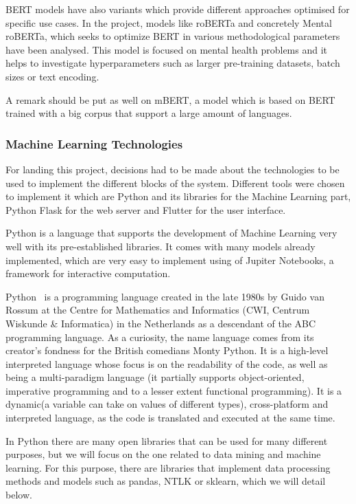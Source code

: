 BERT models have also variants which provide different approaches optimised for specific use cases. In the project, models like roBERTa and concretely Mental roBERTa, which seeks to optimize BERT in various methodological parameters have been analysed. This model is focused on mental health problems and it helps to investigate hyperparameters such as larger pre-training datasets, batch sizes or text encoding.

A remark should be put as well on mBERT, a model which is based on BERT trained with a big corpus that support a large amount of languages. \\


\subsubsection{Machine Learning Technologies}
For landing this project, decisions had to be made about the technologies to be used to implement the different blocks of the system. Different tools were chosen to implement it which are Python and its libraries for the Machine Learning part, Python Flask for the web server and Flutter for the user interface.

Python is a language that supports the development of Machine Learning very well with its pre-established libraries. It comes with many models already implemented, which are very easy to implement using of Jupiter Notebooks, a framework for interactive computation.

Python~\cite{Welcomet44:online} is a programming language created in the late 1980s by Guido van Rossum at the Centre for Mathematics and Informatics (CWI, Centrum Wiskunde \& Informatica) in the Netherlands as a descendant of the ABC programming language. As a curiosity, the name language comes from its creator's fondness for the British comedians Monty Python. It is a high-level interpreted language whose focus is on the readability of the code, as well as being a multi-paradigm language (it partially supports object-oriented, imperative programming and to a lesser extent functional programming). It is a dynamic(a variable can take on values of different types), cross-platform and interpreted language, as the code is translated and executed at the same time.

In Python there are many open libraries that can be used for many different purposes, but we will focus on the one related to data mining and machine learning. For this purpose, there are libraries that implement data processing methods and models such as pandas, NTLK or sklearn, which we will detail below.

